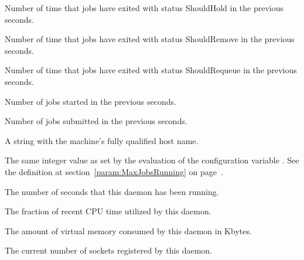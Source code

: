 \begin{description}
\item[\AdAttr{JobsShouldHold}:] Number of time that jobs have exited with status ShouldHold
  in the previous  seconds.

\item[\AdAttr{JobsShouldRemove}:] Number of time that jobs have exited with status ShouldRemove
  in the previous  seconds.

\item[\AdAttr{JobsShouldRequeue}:] Number of time that jobs have exited with status ShouldRequeue
  in the previous  seconds.

\item[\AdAttr{JobsStarted}:] Number of jobs started
  in the previous  seconds.

\item[\AdAttr{JobsSubmitted}:] Number of jobs submitted
  in the previous  seconds.

\item[\AdAttr{Machine}:] A string with the machine's fully qualified 
  host name.

\item[\AdAttr{MaxJobsRunning}:] The same integer value as set by the
  evaluation of the configuration variable .
  See the definition at section~\ref{param:MaxJobsRunning} on
  page~\pageref{param:MaxJobsRunning}.

\item[\AdAttr{MonitorSelfAge}:] The number of seconds that this daemon
  has been running.

\item[\AdAttr{MonitorSelfCPUUsage}:] The fraction of recent CPU time utilized
  by this daemon. 

\item[\AdAttr{MonitorSelfImageSize}:] The amount of virtual memory consumed by
  this daemon in Kbytes.

\item[\AdAttr{MonitorSelfRegisteredSocketCount}:] The current number of sockets
  registered by this daemon.


\end{description}
